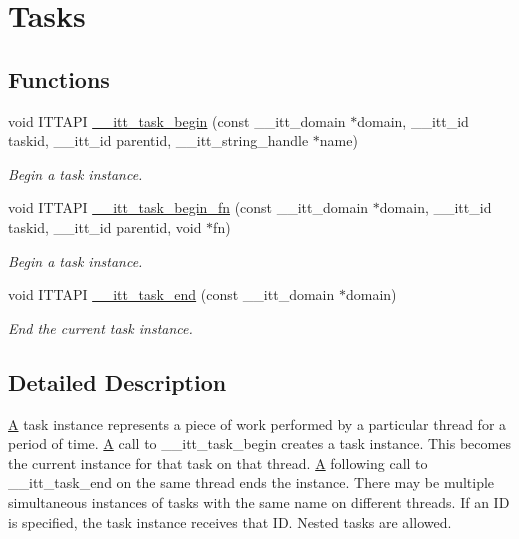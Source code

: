 \hypertarget{group__tasks}{}\section{Tasks}
\label{group__tasks}
\subsection*{Functions}
\begin{DoxyCompactItemize}
\item 
void I\+T\+T\+A\+P\+I \hyperlink{group__tasks_ga2560be40a32fb564081db7197cca4e1b}{\+\_\+\+\_\+itt\+\_\+task\+\_\+begin} (const \+\_\+\+\_\+itt\+\_\+domain $\ast$domain, \+\_\+\+\_\+itt\+\_\+id taskid, \+\_\+\+\_\+itt\+\_\+id parentid, \+\_\+\+\_\+itt\+\_\+string\+\_\+handle $\ast$name)
\begin{DoxyCompactList}\small\item\em Begin a task instance. \end{DoxyCompactList}\item 
void I\+T\+T\+A\+P\+I \hyperlink{group__tasks_gaa1cb092474a9aff3d6cba7b4aebb2760}{\+\_\+\+\_\+itt\+\_\+task\+\_\+begin\+\_\+fn} (const \+\_\+\+\_\+itt\+\_\+domain $\ast$domain, \+\_\+\+\_\+itt\+\_\+id taskid, \+\_\+\+\_\+itt\+\_\+id parentid, void $\ast$fn)
\begin{DoxyCompactList}\small\item\em Begin a task instance. \end{DoxyCompactList}\item 
void I\+T\+T\+A\+P\+I \hyperlink{group__tasks_ga087423f93ad4646ff5207e7851d6fa61}{\+\_\+\+\_\+itt\+\_\+task\+\_\+end} (const \+\_\+\+\_\+itt\+\_\+domain $\ast$domain)
\begin{DoxyCompactList}\small\item\em End the current task instance. \end{DoxyCompactList}\end{DoxyCompactItemize}


\subsection{Detailed Description}
\hyperlink{structA}{A} task instance represents a piece of work performed by a particular thread for a period of time. \hyperlink{structA}{A} call to \+\_\+\+\_\+itt\+\_\+task\+\_\+begin creates a task instance. This becomes the current instance for that task on that thread. \hyperlink{structA}{A} following call to \+\_\+\+\_\+itt\+\_\+task\+\_\+end on the same thread ends the instance. There may be multiple simultaneous instances of tasks with the same name on different threads. If an I\+D is specified, the task instance receives that I\+D. Nested tasks are allowed.


